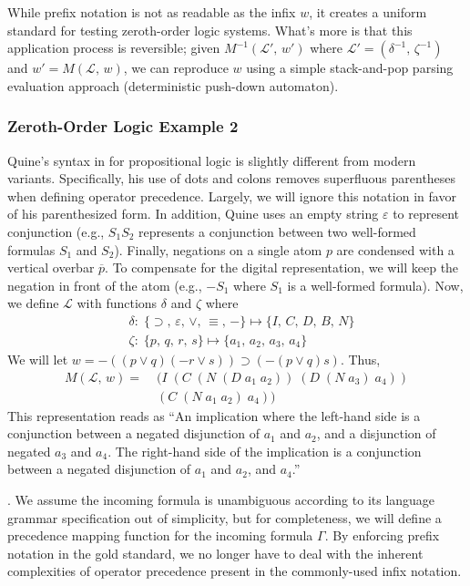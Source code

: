 \documentclass[ms]{uncgdissertationexp2}
\theoremstyle{plain}
\theoremstyle{definition}
\theoremstyle{remark}
\begin{document}
While prefix notation is not as readable as the infix $w$, it creates a uniform standard for testing zeroth-order logic systems. What's more is that this application process is reversible; given $M^{-1}(\mathcal{L}',\,w')$ where $\mathcal{L}' = (\delta^{-1},\,\zeta^{-1})$ and $w' = M(\mathcal{L},\,w)$, we can reproduce $w$ using a simple stack-and-pop parsing evaluation approach (deterministic push-down automaton).
    
\subsubsection{Zeroth-Order Logic Example 2}
Quine's syntax in \cite{methodsoflogic} for propositional logic is slightly different from modern variants. Specifically, his use of dots and colons removes superfluous parentheses when defining operator precedence. Largely, we will ignore this notation in favor of his parenthesized form. In addition, Quine uses an empty string $\varepsilon$ to represent conjunction (e.g., $S_{1}S_{2}$ represents a conjunction between two well-formed formulas $S_{1}$ and $S_{2}$). Finally, negations on a single atom $p$ are condensed with a vertical overbar $\overline{p}$. To compensate for the digital representation, we will keep the negation in front of the atom (e.g., $-S_1$ where $S_1$ is a well-formed formula). Now, we define $\mathcal{L}$ with functions $\delta$ and $\zeta$ where
\begin{align*}
	& \delta:\;\{\supset,\,\varepsilon,\,\lor,\,\equiv,\,-\}\mapsto \{I,\,C,\,D,\,B,\,N\} \\
	& \zeta:\;\{p,\,q,\,r,\,s\} \mapsto \{a_{1},\,a_{2},\,a_{3},\,a_{4}\}  
\end{align*}
We will let $w = -((p\lor q)(-r\lor s)) \supset (-(p\lor q)s)$. Thus,
\begin{align*}
	M(\mathcal{L},\,w) =\;&(I\;(C\;(N\;(D\;a_1\;a_2))\;(D\;(N\;a_3)\;a_4))\\
					   	 &(C\;(N\;a_1\;a_2)\;a_4))
\end{align*}
This representation reads as ``An implication where the left-hand side is a conjunction between a negated disjunction of $a_1$ and $a_2$, and a disjunction of negated $a_3$ and $a_4$. The right-hand side of the implication is a conjunction between a negated disjunction of $a_1$ and $a_2$, and $a_4$.''

. We assume the incoming formula is unambiguous according to its language grammar specification out of simplicity, but for completeness, we will define a precedence mapping function for the incoming formula $\Gamma$. By enforcing prefix notation in the gold standard, we no longer have to deal with the inherent complexities of operator precedence present in the commonly-used infix notation.
\end{document}
